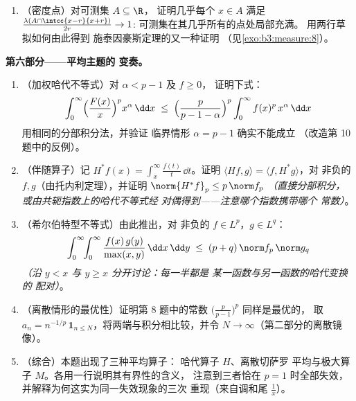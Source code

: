 \begin{problem}
\begin{enumerate}[resume]
{        点}（相对于 $f$）；(b) 对 $f \in L^1$，原函数
        $F(x) = \int_0^xf$ 几乎处处可导，且 $F' =
        f$ 几乎处处成立——勒贝格意义下的微积分
        基本定理的积分部分，闭合了
        由阶梯函数开启的循环，
        （见\cref{pb:b3:measure:1}），表明其逆向部分
        可以不成立。
  \item （密度点）对可测集 $A \subseteq \R$，
        证明几乎每个 $x \in A$ 满足
        $\frac{\lambda(A\cap\intcc{x-r}{x+r})}{2r} \to 1$:
        可测集在其几乎所有的点处局部充满。
        用两行草拟如何由此得到
        施泰因豪斯定理的又一种证明
        （见\cref{exo:b3:measure:8}）。
\end{enumerate}

\medskip
\noindent\textbf{第六部分——平均主题的
变奏。}
\begin{enumerate}[resume]
  \item （加权哈代不等式）对 $\alpha < p - 1$ 及 $f \geq 0$，
        证明下式：
        \[
        \int_0^\infty\Bigl(\frac{F(x)}x\Bigr)^{p}
        x^{\alpha}\,\dd x \;\leq\;
        \Bigl(\frac{p}{p - 1 - \alpha}\Bigr)^{p}
        \int_0^\infty f(x)^p\,x^{\alpha}\,\dd x
        \]
        用相同的分部积分法，并验证
        临界情形 $\alpha = p - 1$ 确实不能成立
        （改造第 10 题中的反例）。
  \item （伴随算子）记 $H^*f(x) =
        \int_x^{\infty}\frac{f(t)}t\,\dd t$。证明 $\langle
        Hf, g\rangle = \langle f, H^*g\rangle$，对
        非负的 $f, g$（由托内利定理），并证明
        $\norm{H^*f}_p \leq p\,\norm f_p$ \emph{（直接分部积分，
        或由共轭指数上的哈代不等式经
        对偶得到——注意哪个指数携带哪个
        常数）}。
  \item （希尔伯特型不等式）由此推出，对
        非负的 $f \in L^p$，$g \in L^q$：
        \[
        \int_0^\infty\!\!\int_0^\infty
        \frac{f(x)\,g(y)}{\max(x,y)}\,\dd x\,\dd y
        \;\leq\; (p + q)\,\norm f_p\,\norm g_q
        \]
        \emph{（沿 $y < x$ 与 $y \geq x$ 分开讨论：每一半都是
        某一函数与另一函数的哈代变换的
        配对）}。
  \item （离散情形的最优性）证明第 8 题中的常数
        $\bigl(\frac p{p-1}\bigr)^p$ 同样是最优的，
        取 $a_n = n^{-1/p}\,\mathbf 1_{n \leq
        N}$，将两端与积分相比较，并令 $N
        \to \infty$（第二部分的离散镜像）。
  \item （综合）本题出现了三种平均算子：
        哈代算子 $H$、离散切萨罗
        平均与极大算子 $M$。各用一行说明其有界性的含义，
        注意到三者恰在 $p = 1$ 时全部失效，
        并解释为何这实为同一失效现象的三次
        重现（来自调和尾
        $\frac1x$）。
\end{enumerate}


\end{problem}
